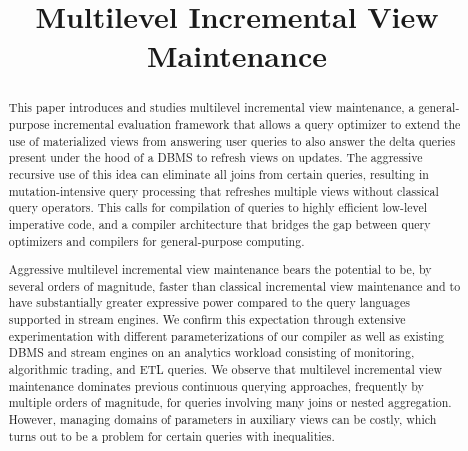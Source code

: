 \documentclass{sig-alternate}
\title{Multilevel Incremental View Maintenance}
\author{
}
\newcommand{\comment}[1]{}
\begin{document}
\maketitle


\begin{abstract}
This paper introduces and studies multilevel incremental view maintenance,
a general-purpose incremental
evaluation framework that allows a query optimizer to extend the use of
materialized views from answering user queries to also answer the delta
queries present under the hood of a DBMS to refresh views on updates. The
aggressive recursive use of this idea can eliminate all joins from certain
queries, resulting in mutation-intensive query processing that refreshes
multiple views without classical query operators. This calls for compilation of
queries to highly efficient low-level imperative code, and a compiler
architecture that bridges the gap between query optimizers and compilers for
general-purpose computing.


\comment{
Multilevel incremental view maintenance generalizes the idea of using
materialized views for query answering by allowing a query optimizer to use
materialized views for also answering delta queries, which are the auxiliary
queries that are used in incremental view maintenance to refresh materialized
views when updates happen. Aggressive recursive use of this idea allows to
eliminate all joins from certain queries and to generate highly efficient
low-level code without classical query operators that performs all query
evaluation and view refreshment work. This calls for the compilation of queries.

In this paper, we present a general compiler architecture for languages such as
SQL. To realize such a compiler, we overcome the challenges of materializing
views with binding patterns (parameters) to support arbitrarily nested queries
with aggregates, complex patterns of side effects that may arise, and the need
to perform sophisticated forms of deforestation and fusion frequently employed
in compilers but almost unknown in the database literature.
}

Aggressive multilevel incremental view maintenance bears the potential to be, by
several orders of magnitude, faster than classical incremental view
maintenance and to have substantially greater expressive power compared to the query
languages supported in stream engines.
%
%
We confirm this expectation through extensive experimentation with different
parameterizations of our compiler as well as existing DBMS and stream engines
on an analytics workload consisting of monitoring, algorithmic trading, and ETL
queries. We observe that multilevel incremental view maintenance dominates
previous continuous querying approaches, frequently by multiple orders of
magnitude, for queries involving many joins or nested aggregation. However,
managing domains of parameters in auxiliary views can be costly, which turns out
to be a problem for certain queries with inequalities.
\end{abstract}
\end{document}
